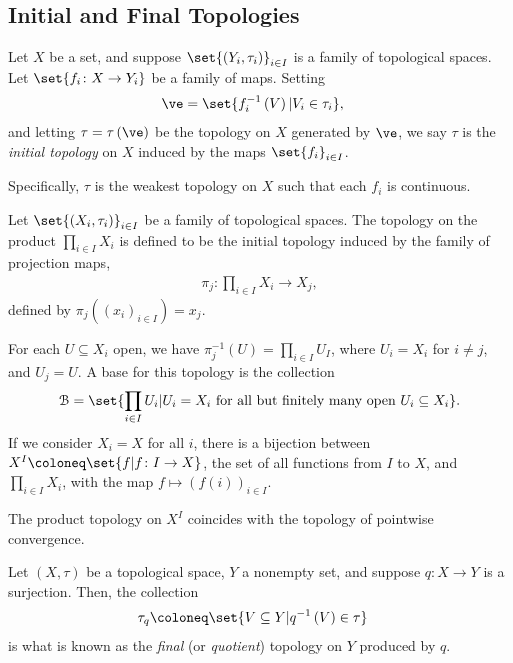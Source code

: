 \subsection{Initial and Final Topologies}%
\begin{definition}
  Let $X$ be a set, and suppose $\set{\left(Y_i,\tau_i\right)}_{i\in I}$ is a family of topological spaces. Let $\set{f_i\colon X\rightarrow Y_i}$ be a family of maps. Setting
  \begin{align*}
    \ve &= \set{f_i^{-1}\left(V\right) | V_i\in \tau_i},
  \end{align*}
  and letting $\tau = \tau\left(\ve\right)$ be the topology on $X$ generated by $\ve$, we say $\tau$ is the \textit{initial topology} on $X$ induced by the maps $\set{f_i}_{i\in I}$.\newline

  Specifically, $\tau$ is the weakest topology on $X$ such that each $f_i$ is continuous.
\end{definition}
\begin{definition}
  Let $\set{\left(X_i,\tau_i\right)}_{i\in I}$ be a family of topological spaces. The topology on the product $\prod_{i\in I}X_i$ is defined to be the initial topology induced by the family of projection maps,
  \begin{align*}
    \pi_j\colon \prod_{i\in I}X_i\rightarrow X_j,
  \end{align*}
  defined by $\pi_j\left(\left(x_i\right)_{i\in I}\right) = x_j$.\newline
  
  For each $U\subseteq X_i$ open, we have $\pi_j^{-1}\left(U\right) = \prod_{i\in I}U_I$, where $U_i = X_i$ for $i\neq j$, and $U_j = U$. A base for this topology is the collection
  \begin{align*}
    \mathcal{B} = \set{\prod_{i\in I}U_i | U_i = X_i\text{ for all but finitely many open }U_i\subseteq X_i}.
  \end{align*}
  If we consider $X_i = X$ for all $i$, there is a bijection between $X^I \coloneq \set{f | f\colon I\rightarrow X}$, the set of all functions from $I$ to $X$, and $\prod_{i\in I}X_i$, with the map $f \mapsto \left(f\left(i\right)\right)_{i\in I}$.\newline

  The product topology on $X^I$ coincides with the topology of pointwise convergence.
\end{definition}
\begin{definition}
  Let $\left(X,\tau\right)$ be a topological space, $Y$ a nonempty set, and suppose $q\colon X\rightarrow Y$ is a surjection. Then, the collection
  \begin{align*}
    \tau_q &\coloneq \set{V\subseteq Y | q^{-1}\left(V\right)\in \tau}
  \end{align*}
  is what is known as the \textit{final} (or \textit{quotient}) topology on $Y$ produced by $q$.
\end{definition}
